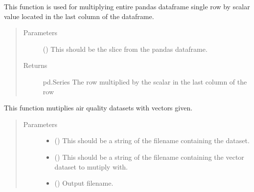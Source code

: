 \documentclass[letterpaper,10pt,english,openany,oneside]{sphinxmanual}
\begin{document}
\begin{fulllineitems}
\label{\detokenize{index:Factorizer.calcrow}}
This function is used for multiplying entire pandas dataframe single row by scalar value located in the last column of the dataframe.
\begin{quote}\begin{description}
\item[{Parameters}] \leavevmode
{} () \textendash{} This should be the slice from the pandas dataframe.

\item[{Returns}] \leavevmode
pd.Series \textendash{} The row multiplied by the scalar in the last column of the row

\end{description}\end{quote}

\end{fulllineitems}


\begin{fulllineitems}
\label{\detokenize{index:Factorizer.factorizer}}
This function mutiplies air quality datasets with vectors given.
\begin{quote}\begin{description}
\item[{Parameters}] \leavevmode\begin{itemize}
\item {} 
 () \textendash{} This should be a string of the filename containing the dataset.

\item {} 
 () \textendash{} This should be a string of the filename containing the vector dataset to mutiply with.

\item {} 
 () \textendash{} Output filename.

\end{itemize}

\end{description}\end{quote}

\end{fulllineitems}
\end{document}
